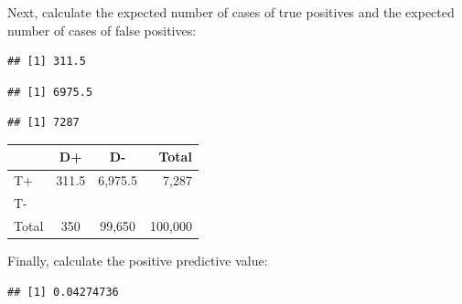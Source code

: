 Next, calculate the expected number of cases of true positives and the expected number of cases of false positives:  
\begin{knitrout}
\color{fgcolor}\begin{kframe}
\begin{alltt}
 \hlkwb{=}  \hlopt{*} 
\end{alltt}
\begin{verbatim}
## [1] 311.5
\end{verbatim}
\begin{alltt}
 \hlkwb{=}  \hlopt{*} \hlstd{(} \hlopt{-} 
\end{alltt}
\begin{verbatim}
## [1] 6975.5
\end{verbatim}
\begin{alltt}
 \hlkwb{=}  \hlopt{+} 
\end{alltt}
\begin{verbatim}
## [1] 7287
\end{verbatim}
\end{kframe}
\end{knitrout}

 
\begin{center}
\begin{tabular}{|l|c|c|r|}
\hline 
& D+ & D- & Total\\ 
\hline
T+ & 311.5 & 6,975.5 & 7,287\\ 
\hline
T- & & & \\ 
\hline 
Total & 350 & 99,650 & 100,000 \\ 
\hline 
\end{tabular} 
\end{center}

Finally, calculate the positive predictive value: 
\begin{knitrout}
\color{fgcolor}\begin{kframe}
\begin{alltt}
 \hlkwb{=} \hlopt{/}
\end{alltt}
\begin{verbatim}
## [1] 0.04274736
\end{verbatim}
\end{kframe}
\end{knitrout}



